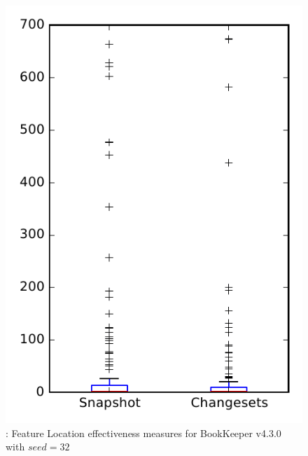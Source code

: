 
\begin{figure}
\centering
\includegraphics[height=0.4\textheight]{figures/flt_seed/rq1_bookkeeper_32}
\caption{\rone: Feature Location effectiveness measures for BookKeeper v4.3.0 with $seed=32$}
\label{fig:flt_seed:rq1:bookkeeper}
\end{figure}
